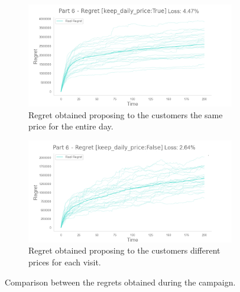 \begin{figure}[!htb]
    \centering

    \begin{subfigure}[!H]{0.8\textwidth}
        \centering
        \includegraphics[width=\textwidth]{images/part6_enable-pricingTrue_keep-daily-priceTrue.png}
        \caption{Regret obtained proposing to the customers the same price for the entire day.}
    \end{subfigure}

    \begin{subfigure}[!H]{0.8\textwidth}
        \centering
        \includegraphics[width=\textwidth]{images/part6_enable-pricingTrue_keep-daily-priceFalse.png}
        \caption{Regret obtained proposing to the customers different prices for each visit.}
    \end{subfigure}
    \caption{Comparison between the regrets obtained during the campaign.}
    \label{fig:regret6Fig}
\end{figure}




